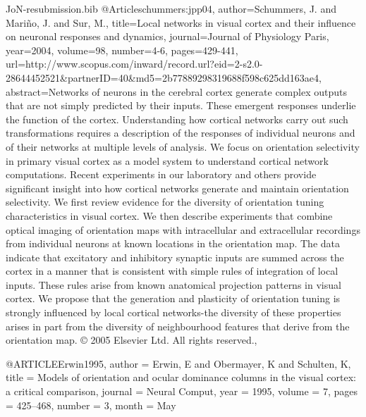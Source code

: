 \documentclass{article}
\begin{document}
\begin{filecontents}{JoN-resubmission.bib}
@Article{schummers:jpp04,
author={Schummers, J.  and Mari{\~n}o, J. and Sur, M.},
title={Local networks in visual cortex and their influence on neuronal responses and dynamics},
journal={Journal of Physiology Paris},
year={2004},
volume={98},
number={4-6},
pages={429-441},
url={http://www.scopus.com/inward/record.url?eid=2-s2.0-28644452521&partnerID=40&md5=2b77889298319688f598c625dd163ae4},
abstract={Networks of neurons in the cerebral cortex generate complex outputs that are not simply predicted by their inputs. These emergent responses underlie the function of the cortex. Understanding how cortical networks carry out such transformations requires a description of the responses of individual neurons and of their networks at multiple levels of analysis. We focus on orientation selectivity in primary visual cortex as a model system to understand cortical network computations. Recent experiments in our laboratory and others provide significant insight into how cortical networks generate and maintain orientation selectivity. We first review evidence for the diversity of orientation tuning characteristics in visual cortex. We then describe experiments that combine optical imaging of orientation maps with intracellular and extracellular recordings from individual neurons at known locations in the orientation map. The data indicate that excitatory and inhibitory synaptic inputs are summed across the cortex in a manner that is consistent with simple rules of integration of local inputs. These rules arise from known anatomical projection patterns in visual cortex. We propose that the generation and plasticity of orientation tuning is strongly influenced by local cortical networks-the diversity of these properties arises in part from the diversity of neighbourhood features that derive from the orientation map. © 2005 Elsevier Ltd. All rights reserved.},
}

@ARTICLE{Erwin1995,
  author = {Erwin, E and Obermayer, K and Schulten, K},
  title = {{Models of orientation and ocular dominance columns in the visual
	cortex: a critical comparison}},
  journal = {Neural Comput},
  year = {1995},
  volume = {7},
  pages = {425--468},
  number = {3},
  month = {May}
}


\end{filecontents}
\end{document}
